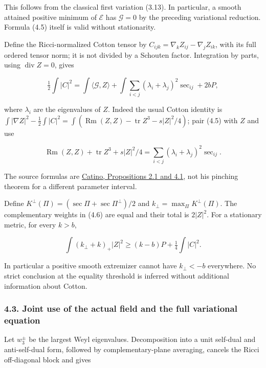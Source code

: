 \documentclass[
  10pt,
]{article}
\begin{document}
This follows from the classical first variation (3.13). In particular, a
smooth attained positive minimum of \(\mathcal E\) has \(\mathcal G=0\)
by the preceding variational reduction. Formula (4.5) itself is valid
without stationarity.

Define the Ricci-normalized Cotton tensor by
\(C_{ijk}=\nabla_kZ_{ij}-\nabla_jZ_{ik}\), with its full ordered tensor
norm; it is not divided by a Schouten factor. Integration by parts,
using \(\operatorname{div}Z=0\), gives

\[
 \tfrac12\int|C|^2
   =\int\langle\mathcal G,Z\rangle
     +\int\sum_{i<j}(\lambda_i+\lambda_j)^2\sec_{ij}+2bP,       \tag{4.6}
\]

where \(\lambda_i\) are the eigenvalues of \(Z\). Indeed the usual
Cotton identity is
\(\int|\nabla Z|^2-\tfrac12\int|C|^2 =\int(\operatorname{Rm}(Z,Z)-\operatorname{tr}Z^3-s|Z|^2/4)\);
pair (4.5) with \(Z\) and use

\[
 \operatorname{Rm}(Z,Z)+\operatorname{tr}Z^3+s|Z|^2/4
                  =\sum_{i<j}(\lambda_i+\lambda_j)^2\sec_{ij}.
\]

The source formulas are \href{https://arxiv.org/pdf/1404.0569}{Catino,
Propositions 2.1 and 4.1}, not his pinching theorem for a different
parameter interval.

Define \(K^\perp(\Pi)=(\sec\Pi+\sec\Pi^\perp)/2\) and
\(k_\perp=\max_\Pi K^\perp(\Pi)\). The complementary weights in (4.6)
are equal and their total is \(2|Z|^2\). For a stationary metric, for
every \(k>b\),

\[
 \int(k_\perp+k)_+|Z|^2
                  \ge(k-b)P+\tfrac14\int|C|^2.                 \tag{4.7}
\]

In particular a positive smooth extremizer cannot have \(k_\perp<-b\)
everywhere. No strict conclusion at the equality threshold is inferred
without additional information about Cotton.

\hypertarget{joint-use-of-the-actual-field-and-the-full-variational-equation}{%
\subsubsection{4.3. Joint use of the actual field and the full
variational
equation}\label{joint-use-of-the-actual-field-and-the-full-variational-equation}}

Let \(w_3^\pm\) be the largest Weyl eigenvalues. Decomposition into a
unit self-dual and anti-self-dual form, followed by complementary-plane
averaging, cancels the Ricci off-diagonal block and gives
\end{document}
